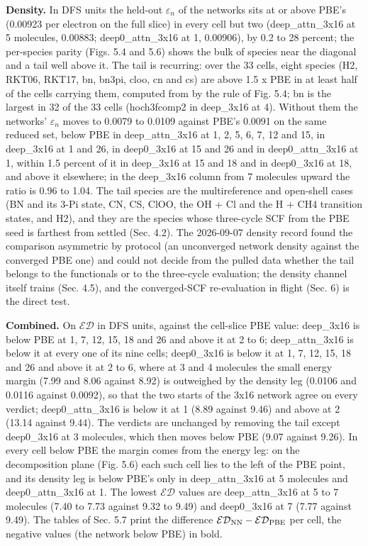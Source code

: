 \documentclass[10pt,a4paper]{article}
\begin{document}
\textbf{Density.} In DFS units the held-out $\varepsilon_n$ of the networks sits at or above PBE's (0.00923 per electron on the full slice) in every cell but two (deep\_attn\_3x16 at 5 molecules, 0.00883; deep0\_attn\_3x16 at 1, 0.00906), by 0.2 to 28 percent; the per-species parity (Figs. 5.4 and 5.6) shows the bulk of species near the diagonal and a tail well above it. The tail is recurring: over the 33 cells, eight species (H2, RKT06, RKT17, bn, bn3pi, cloo, cn and cs) are above 1.5 x PBE in at least half of the cells carrying them, computed from  by the rule of Fig. 5.4; bn is the largest in 32 of the 33 cells (hoch3fcomp2 in deep\_3x16 at 4). Without them the networks' $\varepsilon_n$ moves to 0.0079 to 0.0109 against PBE's 0.0091 on the same reduced set, below PBE in deep\_attn\_3x16 at 1, 2, 5, 6, 7, 12 and 15, in deep\_3x16 at 1 and 26, in deep0\_3x16 at 15 and 26 and in deep0\_attn\_3x16 at 1, within 1.5 percent of it in deep\_3x16 at 15 and 18 and in deep0\_3x16 at 18, and above it elsewhere; in the deep\_3x16 column from 7 molecules upward the ratio is 0.96 to 1.04. The tail species are the multireference and open-shell cases (BN and its 3-Pi state, CN, CS, ClOO, the OH + Cl and the H + CH4 transition states, and H2), and they are the species whose three-cycle SCF from the PBE seed is farthest from settled (Sec. 4.2). The 2026-09-07 density record found the comparison asymmetric by protocol (an unconverged network density against the converged PBE one) and could not decide from the pulled data whether the tail belongs to the functionals or to the three-cycle evaluation; the density channel itself trains (Sec. 4.5), and the converged-SCF re-evaluation in flight (Sec. 6) is the direct test.

\textbf{Combined.} On $\mathcal{ED}$ in DFS units, against the cell-slice PBE value: deep\_3x16 is below PBE at 1, 7, 12, 15, 18 and 26 and above it at 2 to 6; deep\_attn\_3x16 is below it at every one of its nine cells; deep0\_3x16 is below it at 1, 7, 12, 15, 18 and 26 and above it at 2 to 6, where at 3 and 4 molecules the small energy margin (7.99 and 8.06 against 8.92) is outweighed by the density leg (0.0106 and 0.0116 against 0.0092), so that the two starts of the 3x16 network agree on every verdict; deep0\_attn\_3x16 is below it at 1 (8.89 against 9.46) and above at 2 (13.14 against 9.44). The verdicts are unchanged by removing the tail except deep0\_3x16 at 3 molecules, which then moves below PBE (9.07 against 9.26). In every cell below PBE the margin comes from the energy leg: on the decomposition plane (Fig. 5.6) each such cell lies to the left of the PBE point, and its density leg is below PBE's only in deep\_attn\_3x16 at 5 molecules and deep0\_attn\_3x16 at 1. The lowest $\mathcal{ED}$ values are deep\_attn\_3x16 at 5 to 7 molecules (7.40 to 7.73 against 9.32 to 9.49) and deep0\_3x16 at 7 (7.77 against 9.49). The tables of Sec. 5.7 print the difference $\mathcal{ED}_{\rm NN} - \mathcal{ED}_{\rm PBE}$ per cell, the negative values (the network below PBE) in bold.
\end{document}
